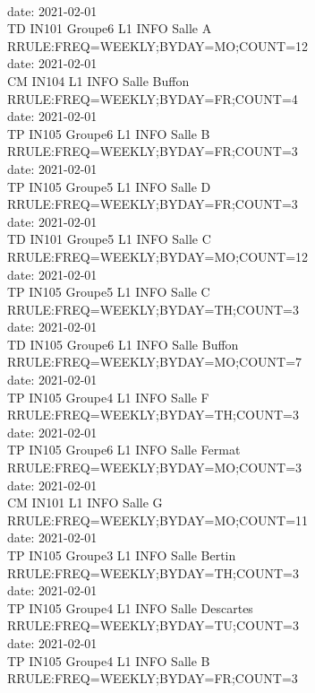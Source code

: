 \documentclass{ltxdoc}
\begin{document}
\begin{center}
\\ date: 2021-02-01\\TD  IN101  Groupe6  L1 INFO  Salle A\\RRULE:FREQ=WEEKLY;BYDAY=MO;COUNT=12
\\ date: 2021-02-01\\CM  IN104    L1 INFO  Salle Buffon\\RRULE:FREQ=WEEKLY;BYDAY=FR;COUNT=4
\\ date: 2021-02-01\\TP  IN105  Groupe6  L1 INFO  Salle B\\RRULE:FREQ=WEEKLY;BYDAY=FR;COUNT=3
\\ date: 2021-02-01\\TP  IN105  Groupe5  L1 INFO  Salle D\\RRULE:FREQ=WEEKLY;BYDAY=FR;COUNT=3
\\ date: 2021-02-01\\TD  IN101  Groupe5  L1 INFO  Salle C\\RRULE:FREQ=WEEKLY;BYDAY=MO;COUNT=12
\\ date: 2021-02-01\\TP  IN105  Groupe5  L1 INFO  Salle C\\RRULE:FREQ=WEEKLY;BYDAY=TH;COUNT=3
\\ date: 2021-02-01\\TD  IN105  Groupe6  L1 INFO  Salle Buffon\\RRULE:FREQ=WEEKLY;BYDAY=MO;COUNT=7
\\ date: 2021-02-01\\TP  IN105  Groupe4  L1 INFO  Salle F\\RRULE:FREQ=WEEKLY;BYDAY=TH;COUNT=3
\\ date: 2021-02-01\\TP  IN105  Groupe6  L1 INFO  Salle Fermat\\RRULE:FREQ=WEEKLY;BYDAY=MO;COUNT=3
\\ date: 2021-02-01\\CM  IN101    L1 INFO  Salle G\\RRULE:FREQ=WEEKLY;BYDAY=MO;COUNT=11
\\ date: 2021-02-01\\TP  IN105  Groupe3  L1 INFO  Salle Bertin\\RRULE:FREQ=WEEKLY;BYDAY=TH;COUNT=3
\\ date: 2021-02-01\\TP  IN105  Groupe4  L1 INFO  Salle Descartes\\RRULE:FREQ=WEEKLY;BYDAY=TU;COUNT=3
\\ date: 2021-02-01\\TP  IN105  Groupe4  L1 INFO  Salle B\\RRULE:FREQ=WEEKLY;BYDAY=FR;COUNT=3

\end{center}
\end{document}
